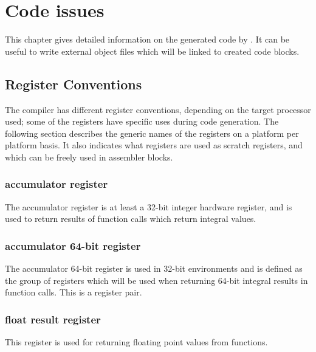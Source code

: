 \chapter{Code issues}
\label{ch:Code}

This chapter gives detailed information on the generated code by
\fpc. It can be useful to write external object files which will
be linked to \fpc created code blocks.

\section{Register Conventions}
\label{se:RegConvs}

The compiler has different register conventions, depending on the
target processor used; some of the registers have specific uses
during code generation. The following section describes the
generic names of the registers on a platform per platform basis. It
also indicates what registers are used as scratch registers, and
which can be freely used in assembler blocks.

\subsection{accumulator register}

The accumulator register is at least a 32-bit integer
hardware register, and is used to return results of
function calls which return integral values.

\subsection{accumulator 64-bit register}

The accumulator 64-bit register is used in 32-bit environments
and is defined as the group of registers which will be used when
returning 64-bit integral results in function calls. This is a
register pair.

\subsection{float result register}

This register is used for returning floating point values
from functions.

